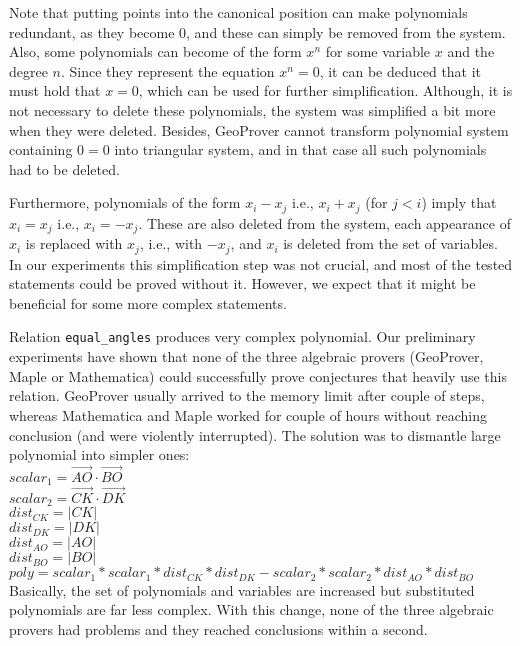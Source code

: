 \documentclass[final,1p,times,authoryear]{elsarticle}
\begin{document}
Note that putting points into the canonical position can make
polynomials redundant, as they become $0$, and these can simply be
removed from the system. Also, some polynomials can become of the form
$x^n$ for some variable $x$ and the degree $n$. Since they represent
the equation $x^n=0$, it can be deduced that it must hold that $x=0$,
which can be used for further simplification. Although, it is not
necessary to delete these polynomials, the system was simplified a bit
more when they were deleted. Besides, GeoProver cannot transform
polynomial system containing $0 = 0$ into triangular system, and in
that case all such polynomials had to be deleted.

Furthermore, polynomials of the form $x_i - x_j$ i.e., $x_i + x_j$
(for $j < i$) imply that $x_i=x_j$ i.e., $x_i=-x_j$. These are also
deleted from the system, each appearance of $x_i$ is replaced with
$x_j$, i.e., with $-x_j$, and $x_i$ is deleted from the set of
variables. In our experiments this simplification step was not
crucial, and most of the tested statements could be proved without
it. However, we expect that it might be beneficial for some more
complex statements.

Relation {\tt equal\_angles} produces very complex polynomial. Our
preliminary experiments have shown that none of the three algebraic
provers (GeoProver, Maple or Mathematica) could successfully prove
conjectures that heavily use this relation. GeoProver usually arrived
to the memory limit after couple of steps, whereas Mathematica and
Maple worked for couple of hours without reaching conclusion (and were
violently interrupted). The solution was to dismantle large
polynomial into simpler ones: \\
$scalar_1 = \overrightarrow{AO}\cdot\overrightarrow{BO}$ \\
$scalar_2 = \overrightarrow{CK}\cdot\overrightarrow{DK}$ \\
$dist_{CK} = |CK|$ \\
$dist_{DK} = |DK|$ \\
$dist_{AO} = |AO|$ \\
$dist_{BO} = |BO|$ \\
$poly = scalar_1 * scalar_1 * dist_{CK} * dist_{DK} - scalar_2 * scalar_2 * dist_{AO} * dist_{BO}$ \\

Basically, the set of polynomials and variables are increased but
substituted polynomials are far less complex. With this change, none
of the three algebraic provers had problems and they reached
conclusions within a second.
\end{document}
